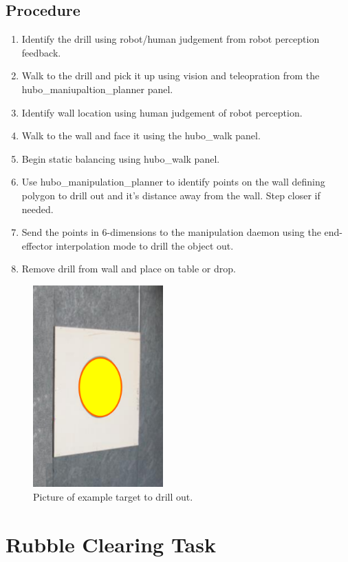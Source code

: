 \documentclass[letterpaper, 10 pt]{report}
\begin{document}
\subsection{Procedure}
\begin{enumerate}
\item Identify the drill using robot/human judgement from robot perception feedback.
\item Walk to the drill and pick it up using vision and teleopration from the hubo\_maniupaltion\_planner panel.
\item Identify wall location using human judgement of robot perception.
\item Walk to the wall and face it using the hubo\_walk panel.
\item Begin static balancing using hubo\_walk panel.
\item Use hubo\_manipulation\_planner to identify points on the wall defining polygon to drill out and it's distance away from the wall. Step closer if needed.
\item Send the points in 6-dimensions to the manipulation daemon using the end-effector interpolation mode to drill the object out.
\item Remove drill from wall and place on table or drop.
\end{enumerate}
\begin{figure}[ht]
  \centering
  \includegraphics[width=5.0cm]{figures/wall-drilling}
  \caption{Picture of example target to drill out.}
  \label{fig:Wall-image}
\end{figure}

\newpage

%
\section{Rubble Clearing Task}\label{chap:rubble-clearing-task}
\end{document}
